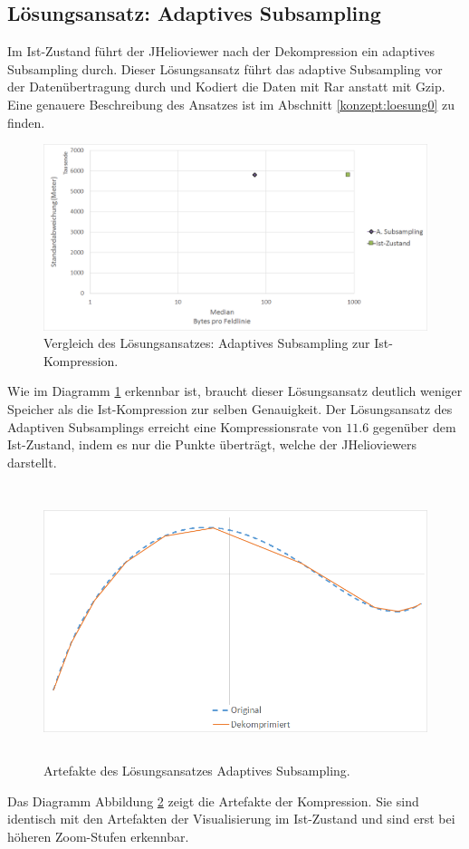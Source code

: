 \subsection{Lösungsansatz: Adaptives Subsampling} \label{resultate:loesung0}
Im Ist-Zustand führt der JHelioviewer nach der Dekompression ein adaptives Subsampling durch. Dieser Lösungsansatz führt das adaptive Subsampling vor der Datenübertragung durch und Kodiert die Daten mit Rar anstatt mit Gzip. Eine genauere Beschreibung des Ansatzes ist im Abschnitt \ref{konzept:loesung0} zu finden.
\begin{figure}[!htbp]
	\center
	\includegraphics[width=1\textwidth,keepaspectratio]{./pictures/resultate/loesung0/loesung0_0.png}
	\caption{Vergleich des Lösungsansatzes: Adaptives Subsampling zur Ist-Kompression.}
	\label{resultate:loesung0:loesung0_0}
\end{figure}
Wie im Diagramm \ref{resultate:loesung0:loesung0_0} erkennbar ist, braucht dieser Lösungsansatz deutlich weniger Speicher als die Ist-Kompression zur selben Genauigkeit. Der Lösungsansatz des Adaptiven Subsamplings erreicht eine Kompressionsrate von $11.6$ gegenüber dem Ist-Zustand, indem es nur die Punkte überträgt, welche der JHelioviewers darstellt.\\
\begin{figure}[!htbp]
	\center
	\includegraphics[width=1\textwidth,height=8cm,keepaspectratio]{./pictures/resultate/loesung0/loesung0_artefakte.png}
	\caption{Artefakte des Lösungsansatzes Adaptives Subsampling.}
	\label{resultate:loesung0:artefakte}
\end{figure}
Das Diagramm Abbildung \ref{resultate:loesung0:artefakte} zeigt die Artefakte der Kompression. Sie sind identisch mit den Artefakten der Visualisierung im Ist-Zustand und sind erst bei höheren Zoom-Stufen erkennbar. 


